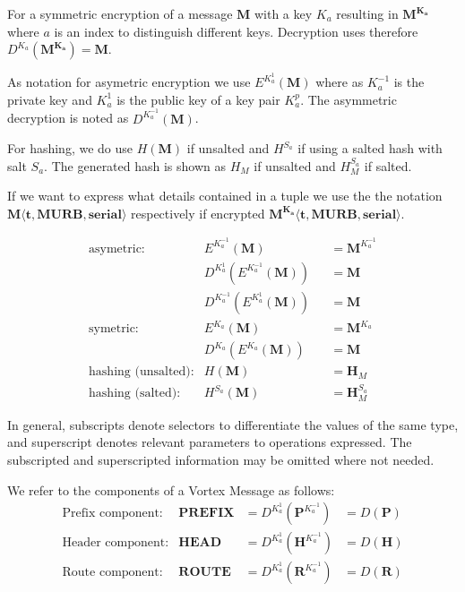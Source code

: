 For a symmetric encryption of a message $\mathbf{M}$ with a key $K_a$ resulting in $\mathbf{M^{K_a}}$ where $a$ is an index to distinguish different keys. Decryption uses therefore $D^{K_a}(\mathbf{M^{K_a}})=\mathbf{M}$.

As notation for asymetric encryption we use $E^{K^{1}_a}(\mathbf{M})$ where as $K^{-1}_a$ is the private key and $K^{1}_a$ is the public key of a key pair $K^p_a$. The asymmetric decryption is noted as $D^{K^{-1}_a}(\mathbf{M})$.

For hashing, we do use $H(\mathbf{M})$ if unsalted and $H^{S_a}$ if using a salted hash with salt $S_a$. The generated hash is shown as $H_M$ if unsalted and $H^{S_a}_M$ if salted.

If we want to express what details contained in a tuple we use the the notation $\mathbf{M\langle t,MURB,serial\rangle }$ respectively if encrypted $\mathbf{M^{K_{a}}\langle t,MURB,serial\rangle}$.

\begin{align*}
\text{asymetric:}         & E^{K^{-1}_a}\left(\mathbf{M}\right)                        	&& =\mathbf{M}^{K^{-1}_a}\\
                          & D^{K^{1}_a}\left(E^{K^{-1}_a}\left(\mathbf{M}\right)\right)	&& =\mathbf{M}\\
                          & D^{K^{-1}_a}\left(E^{K^{1}_a}\left(\mathbf{M}\right)\right)	&& =\mathbf{M}\\
\text{symetric:}          & E^{K_a}\left(\mathbf{M}\right)                             	&& =\mathbf{M}^{K_a}\\
      		              & D^{K_a}\left(E^{K_a}\left(\mathbf{M}\right)\right)          && =\mathbf{M}\\
\text{hashing (unsalted):}& H\left(\mathbf{M}\right)                                   	&& =\mathbf{H}_M\\
\text{hashing (salted):}  & H^{S_a}\left(\mathbf{M}\right)                             	&& =\mathbf{H}^{S_a}_M
\end{align*}

In general, subscripts denote selectors to differentiate the values of the same type, and superscript denotes relevant parameters to operations expressed. The subscripted and superscripted information may be omitted where not needed.

We refer to the components of a Vortex Message as follows:
\begin{align*}
\text{Prefix component:}         & \mathbf{PREFIX}             	&=D^{K^{1}_a}\left(\mathbf{P}^{K^{-1}_a}\right) &=D\left(\mathbf{P}\right)\\
\text{Header component:}         & \mathbf{HEAD}             	&=D^{K^{1}_a}\left(\mathbf{H}^{K^{-1}_a}\right) &=D\left(\mathbf{H}\right)\\
\text{Route component:}         & \mathbf{ROUTE}             	&=D^{K^{1}_a}\left(\mathbf{R}^{K^{-1}_a}\right) &=D\left(\mathbf{R}\right)\\
\end{align*}

